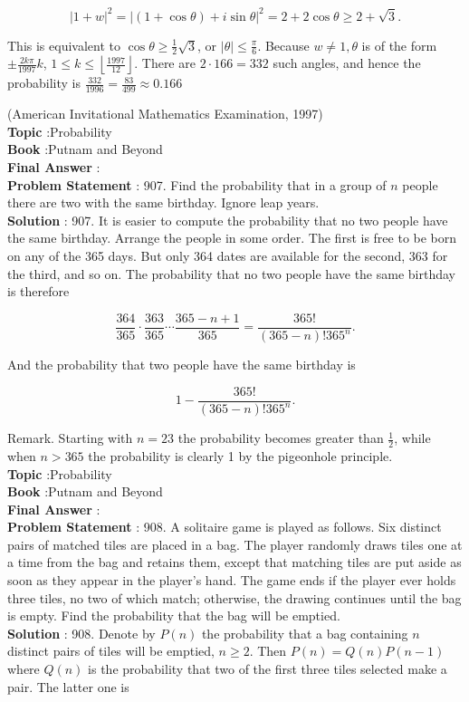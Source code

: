 \documentclass[10pt]{article}
\begin{document}
$$
|1+w|^{2}=|(1+\cos \theta)+i \sin \theta|^{2}=2+2 \cos \theta \geq 2+\sqrt{3} .
$$

This is equivalent to $\cos \theta \geq \frac{1}{2} \sqrt{3}$, or $|\theta| \leq \frac{\pi}{6}$. Because $w \neq 1, \theta$ is of the form $\pm \frac{2 k \pi}{1997} k$, $1 \leq k \leq\left\lfloor\frac{1997}{12}\right\rfloor$. There are $2 \cdot 166=332$ such angles, and hence the probability is $\frac{332}{1996}=\frac{83}{499} \approx 0.166$

(American Invitational Mathematics Examination, 1997)
\\
\textbf{Topic} :Probability\\
\textbf{Book} :Putnam and Beyond\\
\textbf{Final Answer} :\\


\textbf{Problem Statement} :
907. Find the probability that in a group of $n$ people there are two with the same birthday. Ignore leap years.
\\
\textbf{Solution} :
907. It is easier to compute the probability that no two people have the same birthday. Arrange the people in some order. The first is free to be born on any of the 365 days. But only 364 dates are available for the second, 363 for the third, and so on. The probability that no two people have the same birthday is therefore

$$
\frac{364}{365} \cdot \frac{363}{365} \cdots \frac{365-n+1}{365}=\frac{365 !}{(365-n) ! 365^{n}} .
$$

And the probability that two people have the same birthday is

$$
1-\frac{365 !}{(365-n) ! 365^{n}} .
$$

Remark. Starting with $n=23$ the probability becomes greater than $\frac{1}{2}$, while when $n>365$ the probability is clearly 1 by the pigeonhole principle. 
\\
\textbf{Topic} :Probability\\
\textbf{Book} :Putnam and Beyond\\
\textbf{Final Answer} :\\


\textbf{Problem Statement} :
908. A solitaire game is played as follows. Six distinct pairs of matched tiles are placed in a bag. The player randomly draws tiles one at a time from the bag and retains them, except that matching tiles are put aside as soon as they appear in the player's hand. The game ends if the player ever holds three tiles, no two of which match; otherwise, the drawing continues until the bag is empty. Find the probability that the bag will be emptied.
\\
\textbf{Solution} :
908. Denote by $P(n)$ the probability that a bag containing $n$ distinct pairs of tiles will be emptied, $n \geq 2$. Then $P(n)=Q(n) P(n-1)$ where $Q(n)$ is the probability that two of the first three tiles selected make a pair. The latter one is
\end{document}
